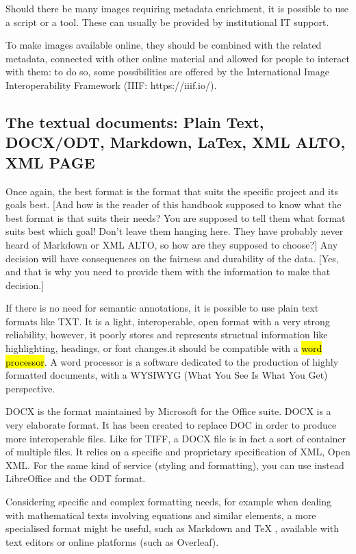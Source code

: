 \documentclass[
  letterpaper,
  DIV=11,
  numbers=noendperiod]{scrreprt}
\begin{document}
Should there be many images requiring metadata enrichment, it is
possible to use a script or a tool. These can usually be provided by
institutional IT support.

To make images available online, they should be combined with the
related metadata, connected with other online material and allowed for
people to interact with them: to do so, some possibilities are offered
by the International Image Interoperability Framework (IIIF:
https://iiif.io/).

\subsection{The textual documents: Plain Text, DOCX/ODT, Markdown,
LaTex, XML ALTO, XML
PAGE}\label{the-textual-documents-plain-text-docxodt-markdown-latex-xml-alto-xml-page}

Once again, the best format is the format that suits the specific
project and its goals best. {[}And how is the reader of this handbook
supposed to know what the best format is that suits their needs? You are
supposed to tell them what format suits best which goal! Don't leave
them hanging here. They have probably never heard of Markdown or XML
ALTO, so how are they supposed to choose?{]} Any decision will have
consequences on the fairness and durability of the data. {[}Yes, and
that is why you need to provide them with the information to make that
decision.{]}

If there is no need for semantic annotations, it is possible to use
plain text formats like TXT. It is a light, interoperable, open format
with a very strong reliability, however, it poorly stores and represents
structual information like highlighting, headings, or font changes.it
should be compatible with a \hl{word processor}. A word processor is a
software dedicated to the production of highly formatted documents, with
a WYSIWYG (What You See Is What You Get) perspective.

DOCX is the format maintained by Microsoft for the Office suite. DOCX is
a very elaborate format. It has been created to replace DOC in order to
produce more interoperable files. Like for TIFF, a DOCX file is in fact
a sort of container of multiple files. It relies on a specific and
proprietary specification of XML, Open XML. For the same kind of service
(styling and formatting), you can use instead LibreOffice and the ODT
format.

Considering specific and complex formatting needs, for example when
dealing with mathematical texts involving equations and similar
elements, a more specialised format might be useful, such as Markdown
and TeX , available with text editors or online platforms (such as
Overleaf).
\end{document}
